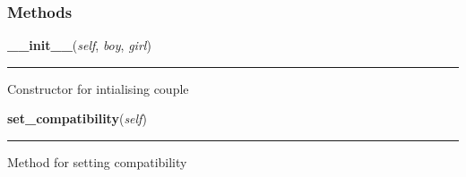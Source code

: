 
  \subsubsection{Methods}

    \label{couples:Couple:__init__}

    \vspace{0.5ex}

\hspace{.8\funcindent}\begin{boxedminipage}{\funcwidth}

    \raggedright \textbf{\_\_init\_\_}(\textit{self}, \textit{boy}, \textit{girl})

    \vspace{-1.5ex}

    \rule{\textwidth}{0.5\fboxrule}
\setlength{\parskip}{2ex}
    Constructor for intialising couple

\setlength{\parskip}{1ex}
    \end{boxedminipage}

    \label{couples:Couple:set_compatibility}

    \vspace{0.5ex}

\hspace{.8\funcindent}\begin{boxedminipage}{\funcwidth}

    \raggedright \textbf{set\_compatibility}(\textit{self})

    \vspace{-1.5ex}

    \rule{\textwidth}{0.5\fboxrule}
\setlength{\parskip}{2ex}
    Method for setting compatibility

\setlength{\parskip}{1ex}
    \end{boxedminipage}

    \label{couples:Couple:set_happiness}


